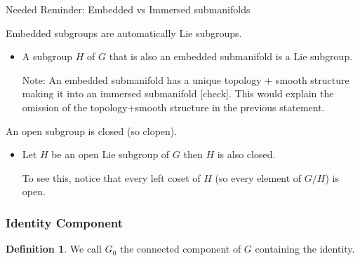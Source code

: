 \documentclass{report}
\theoremstyle{definition}
\newtheorem{definition}{Definition}
\begin{document}
Needed Reminder: Embedded vs Immersed submanifolds

Embedded subgroups are automatically Lie subgroups.
\begin{itemize}
    \item A subgroup $H$ of $G$ that is also an embedded submanifold is a Lie subgroup.

    Note: An embedded submanifold has a unique topology + smooth structure making it into an immersed submanifold [check]. This would explain the omission of the topology+smooth structure in the previous statement.
\end{itemize}

An open subgroup is closed (so clopen).
\begin{itemize}
    \item Let $H$ be an open Lie subgroup of $G$ then $H$ is also closed.

    To see this, notice that every left coset of $H$ (so every element of $G/H$) is open.
\end{itemize}

\subsubsection{Identity Component}

\begin{definition}
    We call $G_0$ the connected component of $G$ containing the identity.
\end{definition}
\end{document}
